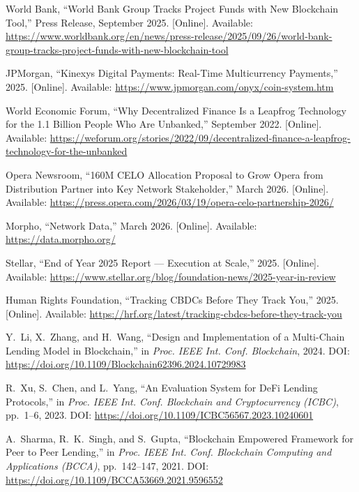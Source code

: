 \documentclass[12pt,a4paper]{report}
\begin{document}
{\begin{enumerate}[label={[\arabic*]}]
\item World Bank, ``World Bank Group Tracks Project Funds with New Blockchain Tool,'' Press Release, September 2025. [Online]. Available: \url{https://www.worldbank.org/en/news/press-release/2025/09/26/world-bank-group-tracks-project-funds-with-new-blockchain-tool}

\item JPMorgan, ``Kinexys Digital Payments: Real-Time Multicurrency Payments,'' 2025. [Online]. Available: \url{https://www.jpmorgan.com/onyx/coin-system.htm}

\item World Economic Forum, ``Why Decentralized Finance Is a Leapfrog Technology for the 1.1 Billion People Who Are Unbanked,'' September 2022. [Online]. Available: \url{https://weforum.org/stories/2022/09/decentralized-finance-a-leapfrog-technology-for-the-unbanked}

\item Opera Newsroom, ``160M CELO Allocation Proposal to Grow Opera from Distribution Partner into Key Network Stakeholder,'' March 2026. [Online]. Available: \url{https://press.opera.com/2026/03/19/opera-celo-partnership-2026/}

\item Morpho, ``Network Data,'' March 2026. [Online]. Available: \url{https://data.morpho.org/}

\item Stellar, ``End of Year 2025 Report --- Execution at Scale,'' 2025. [Online]. Available: \url{https://www.stellar.org/blog/foundation-news/2025-year-in-review}

\item Human Rights Foundation, ``Tracking CBDCs Before They Track You,'' 2025. [Online]. Available: \url{https://hrf.org/latest/tracking-cbdcs-before-they-track-you}

\item Y.~Li, X.~Zhang, and H.~Wang, ``Design and Implementation of a Multi-Chain Lending Model in Blockchain,'' in \textit{Proc. IEEE Int. Conf. Blockchain}, 2024. DOI: \url{https://doi.org/10.1109/Blockchain62396.2024.10729983}

\item R.~Xu, S.~Chen, and L.~Yang, ``An Evaluation System for DeFi Lending Protocols,'' in \textit{Proc. IEEE Int. Conf. Blockchain and Cryptocurrency (ICBC)}, pp.~1--6, 2023. DOI: \url{https://doi.org/10.1109/ICBC56567.2023.10240601}

\item A.~Sharma, R.~K.~Singh, and S.~Gupta, ``Blockchain Empowered Framework for Peer to Peer Lending,'' in \textit{Proc. IEEE Int. Conf. Blockchain Computing and Applications (BCCA)}, pp.~142--147, 2021. DOI: \url{https://doi.org/10.1109/BCCA53669.2021.9596552}


\end{enumerate}}
\end{document}
